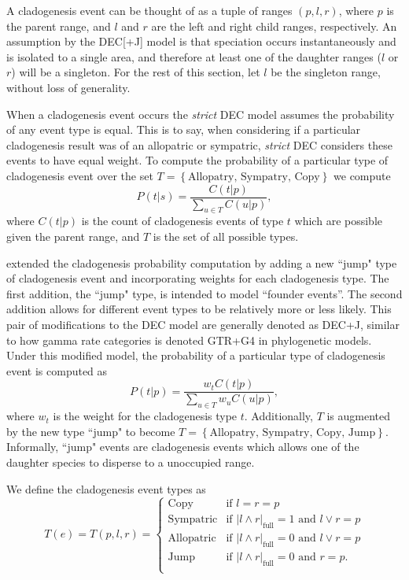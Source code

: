 \documentclass[a4paper]{article}
\newcommand{\CountFull}[1]{|#1|_\text{full}}
\newcommand{\rand}[2]{#1 \land #2}
\newcommand{\ror}[2]{#1 \lor #2}
\begin{document}
A cladogenesis event can be thought of as a tuple of ranges $(p, l, r)$, where $p$ is the parent range, and $l$ and $r$
are the left and right child ranges, respectively. 
An assumption by the DEC[+J] model is that speciation occurs instantaneously and is isolated to a single area, and
therefore at least one of the daughter ranges ($l$ or $r$) will be a singleton.
For the rest of this section, let $l$ be the singleton range, without loss of generality.

When a cladogenesis event occurs the \textit{strict} DEC model assumes the probability of any event type is equal.
This is to say, when considering if a particular cladogenesis result was of an allopatric or sympatric, \textit{strict}
DEC considers these events to have equal weight.
To compute the probability of a particular type of cladogenesis event over the set \(T = \left\{\text{Allopatry,
Sympatry, Copy}\right\}\) we compute
\[
	P(t |
	s) = \frac{C(t | p)}{\sum_{u \in T} C(u | p)},
\]
where \( C(t|p) \) is the count of cladogenesis events of type $t$ which are possible given the parent range, and $T$ is
the set of all possible types.

\citet{ModelSelectionMatzke2014} extended the cladogenesis probability computation by adding a new ``jump" type of
cladogenesis event and incorporating weights for each cladogenesis type.
The first addition, the ``jump" type, is intended to model ``founder events''.
The second addition allows for different event types to be relatively more or less likely.
This pair of modifications to the DEC model are generally denoted as DEC+J, similar to how gamma rate categories is
denoted GTR+G4 in phylogenetic models.
Under this modified model, the probability of a particular type of cladogenesis event is computed as
\begin{equation}
	P(t | p) = \frac{w_t C(t | p)}{\sum_{u \in T} w_u C(u | p)},
\end{equation}
where $w_t$ is the weight for the cladogenesis type $t$.
Additionally, $T$ is augmented by the new type ``jump" to become \(T = \left\{\text{Allopatry, Sympatry, Copy,
Jump}\right\} \).
Informally, ``jump" events are cladogenesis events which allows one of the daughter species to disperse to a unoccupied
range.

We define the cladogenesis event types as
\begin{equation}
T(e) = T(p, l, r) = 
\begin{cases}
  \text{Copy} & \text{if }l = r = p \\ 
  \text{Sympatric} & \text{if } \CountFull{\rand{l}{r}} = 1 \text{ and } \ror{l}{r} = p \\ 
  \text{Allopatric} & \text{if } \CountFull{\rand{l}{r}} = 0 \text{ and } \ror{l}{r} = p   \\ 
  \text{Jump} & \text{if } \CountFull{\rand{l}{r}} = 0 \text{ and } r = p. \\ 
\end{cases}
\label{eq:clad-test}
\end{equation}
\end{document}
